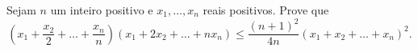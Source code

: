Sejam $n$ um inteiro positivo e $x_1, \ldots, x_n$ reais positivos.
Prove que \[
	\left(x_1 + \frac{x_2}{2} + \ldots + \frac{x_n}{n}\right) \left(x_1 + 2x_2 + \ldots + nx_n\right) \le \frac{(n+1)^2}{4n} \left(x_1 + x_2 + \ldots + x_n\right)^2 .
\]
